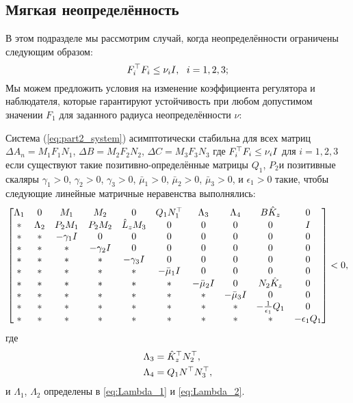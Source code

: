\subsection{Мягкая неопределённость}\label{sec:ch3/sect2/sub2}
 В этом подразделе мы рассмотрим случай, когда неопределённости ограничены следующим образом:
 \begin{equation}
 	\label{eq:part2_nu_uncertainty}
 	{F}_i^\top{F}_i\leq \nu_i {I}, \ \ i=1,2,3;
 \end{equation}
 Мы можем предложить условия на изменение коэффициента регулятора и наблюдателя, которые гарантируют устойчивость при любом допустимом значении ${F}_1$ для заданного радиуса неопределённости $\nu$:
 \begin{theorem}\label{thm:part2_LMI_2}
 	Система (\ref{eq:part2_system}) асимптотически стабильна для всех матриц
 	$\Delta {A}_n={M}_1{F}_1{N}_1$, 
 	$\Delta {B}= {M}_2{F}_2{N}_2$, 
 	$\Delta {C} = {M}_3{F}_3{N}_3$
 	где
 	${F}_i^\top{F}_i\leq \nu_i {I}$ для $i=1,2,3$
 	если существуют такие позитивно-определённые матрицы ${Q}_1$, ${P}_2$и позитивные скаляры
 	$\gamma_1>0$, $\gamma_2>0$, $\gamma_3>0$, $\bar{\mu}_1>0$, $\bar{\mu}_2>0$, $\bar{\mu}_3>0$, и $\epsilon_1 > 0$ такие, чтобы следующие линейные матричные неравенства выполнялись:
 	\begin{equation}
 		\label{eq:thm4_final_LMI}
 		\begin{bmatrix}
 			{\Lambda}_1 & 0 & {M}_1 & {M}_2&0 & {Q}_1{N}_1^\top & {\Lambda}_3 &{\Lambda}_4 & {B}\hat{{K}}_z & 0\\
 			* & {\Lambda}_2 & {P}_2{M}_1 & {P}_2{M}_2 & \hat{{L}}_z{M}_3& 0& 0&0&0&{I} \\
 			* & * & -\gamma_1{I} & 0&0&0&0&0&0&0\\
 			* & * &*  & -\gamma_2{I}&0&0&0&0&0&0\\
 			*& * & * &*  & -\gamma_3{I}&0&0&0&0&0\\
 			* &* & * & * & *&-\bar{\mu}_1{I}&0&0&0&0\\
 			* & * & * &*& *&*&-\bar{\mu}_2{I}& 0&{N}_2\hat{{K}}_z&0\\
 			*&*&* &* & * & * & *&-\bar{\mu}_3{I}&0&0\\
 			* & * & *&*&* & *&*&*&-\frac{1}{\epsilon_1}{Q}_1&0\\
 			* & * & * & *&*&*&*&*&*&-\epsilon_1{Q}_1\\
 		\end{bmatrix}<0,
 	\end{equation}
 	где
 	\begin{align}
 		{\Lambda}_3&=\hat{{K}}_z^\top{N}_2^\top,\\ {\Lambda}_4&={Q}_1{N}^\top{N}_3^\top,
 	\end{align}
 	и ${\Lambda}_1$, ${\Lambda}_2$ определены в \eqref{eq:Lambda_1} и \eqref{eq:Lambda_2}. 
 \end{theorem}
